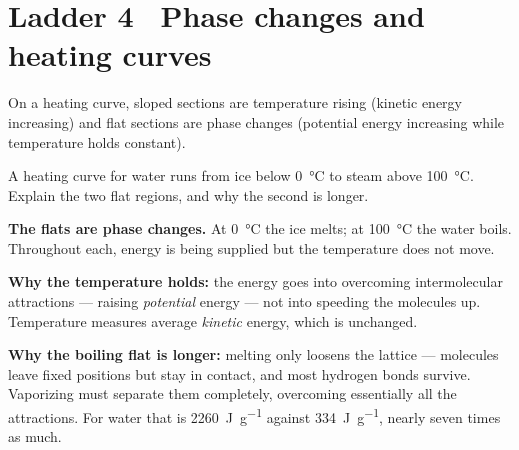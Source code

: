 \documentclass{apchem-worksheet}
\begin{document}
\section*{\sffamily Ladder 4 \textbullet\ Phase changes and heating curves}

On a heating curve, sloped sections are temperature rising (kinetic energy
increasing) and flat sections are phase changes (potential energy
increasing while temperature holds constant).

\begin{workedexample}
A heating curve for water runs from ice below \SI{0}{\celsius} to steam
above \SI{100}{\celsius}. Explain the two flat regions, and why the second
is longer.

\textbf{The flats are phase changes.} At \SI{0}{\celsius} the ice melts;
at \SI{100}{\celsius} the water boils. Throughout each, energy is being
supplied but the temperature does not move.

\textbf{Why the temperature holds:} the energy goes into overcoming
intermolecular attractions --- raising \emph{potential} energy --- not into
speeding the molecules up. Temperature measures average \emph{kinetic}
energy, which is unchanged.

\textbf{Why the boiling flat is longer:} melting only loosens the lattice
--- molecules leave fixed positions but stay in contact, and most hydrogen
bonds survive. Vaporizing must separate them completely, overcoming
essentially all the attractions. For water that is
\SI{2260}{\joule\per\gram} against \SI{334}{\joule\per\gram}, nearly seven
times as much.
\end{workedexample}
\end{document}
